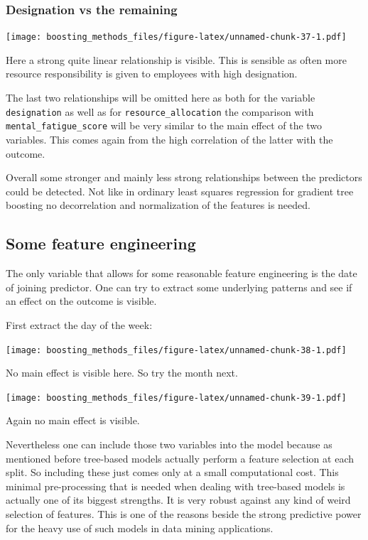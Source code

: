 \documentclass[
]{book}
\begin{document}
\hypertarget{designation-vs-the-remaining}{%
\subsubsection{Designation vs the remaining}\label{designation-vs-the-remaining}}

\texttt{[image: boosting\_methods\_files/figure-latex/unnamed-chunk-37-1.pdf]}

Here a strong quite linear relationship is visible. This is sensible as often more resource responsibility is given to employees with high designation.

The last two relationships will be omitted here as both for the variable \texttt{designation} as well as for \texttt{resource\_allocation} the comparison with \texttt{mental\_fatigue\_score} will be very similar to the main effect of the two variables. This comes again from the high correlation of the latter with the outcome.

Overall some stronger and mainly less strong relationships between the predictors could be detected. Not like in ordinary least squares regression for gradient tree boosting no decorrelation and normalization of the features is needed.

\hypertarget{some-feature-engineering}{%
\subsection{Some feature engineering}\label{some-feature-engineering}}

The only variable that allows for some reasonable feature engineering is the date of joining predictor. One can try to extract some underlying patterns and see if an effect on the outcome is visible.

First extract the day of the week:

\texttt{[image: boosting\_methods\_files/figure-latex/unnamed-chunk-38-1.pdf]}

No main effect is visible here. So try the month next.

\texttt{[image: boosting\_methods\_files/figure-latex/unnamed-chunk-39-1.pdf]}

Again no main effect is visible.

Nevertheless one can include those two variables into the model because as mentioned before tree-based models actually perform a feature selection at each split. So including these just comes only at a small computational cost. This minimal pre-processing that is needed when dealing with tree-based models is actually one of its biggest strengths. It is very robust against any kind of weird selection of features. This is one of the reasons beside the strong predictive power for the heavy use of such models in data mining applications.\citep{elements}
\end{document}
